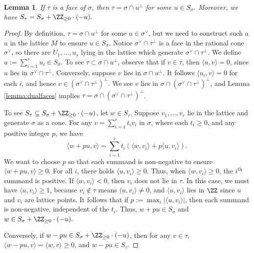 \documentclass[12pt]{amsart}
\theoremstyle{plain}
\newtheorem{lemma}[theorem]{Lemma}
\begin{document}
\begin{lemma}
If $\tau$ is a face of $\sigma$, then $\tau = \sigma \cap u^\perp$ for some $u \in S_\sigma$.
Moreover, we have $S_\tau =S_\sigma + \ZZ_{\ge 0} \cdot (-u).$
\end{lemma}
\begin{proof}
By definition, $\tau = \sigma \cap u^\perp$ for some $u \in \sigma^\vee$, but we need to construct such a $u$ in the lattice $M$ to ensure $u \in S_\sigma$.
Notice $\sigma^\vee \cap \tau^\perp$ is a face in the rational cone $\sigma^\vee$, so there are $U_1, \ldots, u_s$ lying in the lattice which generate $\sigma^\vee \cap \tau^\perp$.
We define $u := \sum_{i=1}^s u_i \in S_\sigma$.
To see $\tau \subset \sigma \cap u^\perp$, observe that if $v \in \tau$, then $\langle u, v\rangle = 0$, since $u$ lies in $\sigma^\vee \cap \tau^\perp$.
Conversely, suppose $v$ lies in $\sigma \cap u^\perp$.
It follows $\langle u_i, v \rangle = 0$ for each $i$, and hence $v \in (\sigma^\vee \cap \tau^\perp)^\perp$.
We see $v$ lies in $\sigma \cap (\sigma^\vee \cap \tau^\perp)^\perp$, and Lemma \ref{lemma:dualfaces} implies  $\tau = \sigma \cap (\sigma^\vee \cap \tau^\perp)^\perp$.

To see $S_\tau \subseteq S_\sigma + \ZZ_{\ge 0} \cdot (-u)$, let $w \in S_\tau$.
Suppose $v_1, \ldots, v_r$ lie in the lattice and generate $\sigma$ as a cone.
For any $v = \sum_{i=1}^r t_i v_i$ in $\sigma$, where each $t_i \ge 0$, and any positive integer $p$, we have
$$\langle w + pu, v\rangle = \sum_{i=1}^r t_i \left( \langle w, v_i \rangle + p \langle u, v_i \rangle \right).$$
We want to choose $p$ so that each summand is non-negative to ensure $\langle w+pu, v \rangle \ge 0$.
For all $i$, there holds $\langle u, v_i \rangle \ge 0$.
Thus, when $\langle w, v_i \rangle \ge 0$, the $i^\text{th}$ summand is positive.
If $\langle w, v_i\rangle < 0$, then $v_i$ does not lie in $\tau$.
In this case, we must have $\langle u, v_i\rangle \ge 1$, because $v_i \notin \tau$ means $\langle u, v_i \rangle \ne 0$, and $\langle u, v_i \rangle$ lies in $\ZZ$ since $u$ and $v_i$ are lattice points.
It follows that if $p := \max_i |\langle u, v_i\rangle|$, then each summand is non-negative, independent of the $t_i$.
Thus, $w + pu \in S_\sigma$ and $w \in S_\sigma + \ZZ_{\ge 0} \cdot (-u).$

Conversely, if $w - pu \in S_\sigma + \ZZ_{\ge 0} \cdot (-u)$, then for any $v \in \tau$, $\langle w - pu, v\rangle = \langle w, v \rangle \ge 0$, and $w - pu \in S_\tau$.
\end{proof}
\end{document}
